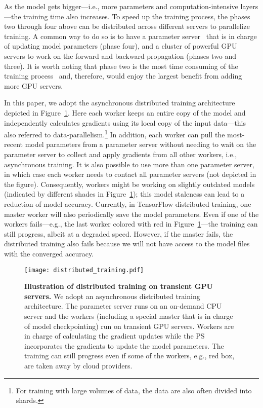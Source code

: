 


As the model gets bigger---i.e., more parameters and computation-intensive
layers---the training time also increases.  To speed up the training process,
the phases two through four above can be distributed across different servers
to parallelize training.  A common way to do so is to have a parameter
server~\cite{stale1,geeps} that is in charge of updating model parameters (phase
four), and a cluster of powerful GPU servers to work on the forward and
backward propagation (phases two and three).  It is worth noting that phase two is
the most time consuming of the training process~\cite{efficient_dnn} and, therefore, would enjoy the
largest benefit from adding more GPU servers.

In this paper, we adopt the asynchronous distributed training architecture
depicted in Figure~\ref{bg:dist_train}. Here  each worker keeps an entire copy
of the model and independently calculates gradients using its local copy of the
input data---this also referred to data-parallelism.\footnote{For training with
large volumes of data, the data are also often divided into shards.} In
addition, each worker can pull the most-recent model parameters from a
parameter server without needing to wait on the parameter server to collect and
apply gradients from all other workers, i.e., asynchronous training. It is also
possible to use more than one parameter server, in which case each worker
needs to contact all parameter servers (not depicted in the figure).
Consequently, workers might be working on slightly outdated models (indicated
by different shades in Figure~\ref{bg:dist_train}); this model staleness can
lead to a reduction of model accuracy. Currently, in TensorFlow distributed
training, one master worker will also periodically save the model parameters.
Even if one of the workers fails---e.g., the last worker colored with red in
Figure~\ref{bg:dist_train}---the training can still progress, albeit at a
degraded speed. However, if the master fails, the distributed training
also fails because we will not have access to the model files with the
converged accuracy. 


\begin{figure}[t]
\centering
    \texttt{[image: distributed\_training.pdf]}
\caption{\textbf{Illustration of distributed training on transient GPU
  servers.} We adopt an asynchronous distributed training architecture. The
  parameter server runs on an on-demand CPU server and the workers (including a
  special master that is in charge of model checkpointing) run on transient GPU servers. Workers are in charge of calculating the gradient updates while the PS incorporates the gradients to update the model parameters. The training can still progress even if some of the workers, e.g., red box, are taken away by cloud providers.}
    \label{bg:dist_train}
\end{figure}


